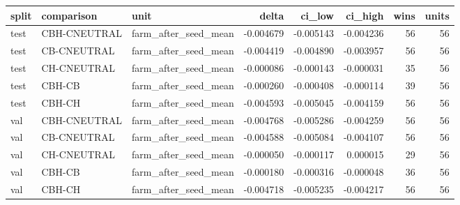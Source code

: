 \begin{tabular}{lllrrrrr}
\toprule
split & comparison & unit & delta & ci\_low & ci\_high & wins & units \\
\midrule
test & CBH-CNEUTRAL & farm\_after\_seed\_mean & -0.004679 & -0.005143 & -0.004236 & 56 & 56 \\
test & CB-CNEUTRAL & farm\_after\_seed\_mean & -0.004419 & -0.004890 & -0.003957 & 56 & 56 \\
test & CH-CNEUTRAL & farm\_after\_seed\_mean & -0.000086 & -0.000143 & -0.000031 & 35 & 56 \\
test & CBH-CB & farm\_after\_seed\_mean & -0.000260 & -0.000408 & -0.000114 & 39 & 56 \\
test & CBH-CH & farm\_after\_seed\_mean & -0.004593 & -0.005045 & -0.004159 & 56 & 56 \\
val & CBH-CNEUTRAL & farm\_after\_seed\_mean & -0.004768 & -0.005286 & -0.004259 & 56 & 56 \\
val & CB-CNEUTRAL & farm\_after\_seed\_mean & -0.004588 & -0.005084 & -0.004107 & 56 & 56 \\
val & CH-CNEUTRAL & farm\_after\_seed\_mean & -0.000050 & -0.000117 & 0.000015 & 29 & 56 \\
val & CBH-CB & farm\_after\_seed\_mean & -0.000180 & -0.000316 & -0.000048 & 36 & 56 \\
val & CBH-CH & farm\_after\_seed\_mean & -0.004718 & -0.005235 & -0.004217 & 56 & 56 \\
\bottomrule
\end{tabular}
